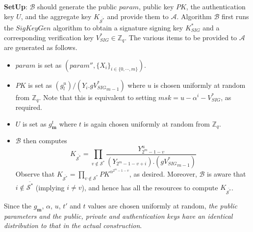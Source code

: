 \noindent \textbf{SetUp}: $\mathcal{B}$ should generate the public $param$, public key $PK$, the authentication key $U$, and the aggregate key $K_{\overline{{\mathcal{S}}^{*}}}$ and provide them to $\mathcal{A}$. Algorithm $\mathcal{B}$ first runs the $SigKeyGen$ algorithm to obtain a signature signing key $K^{*}_{SIG}$ and a corresponding verification key $V^{*}_{SIG} \in \mathbb{Z}_q$. The various items to be provided to $\mathcal{A}$ are generated as follows.
\begin{itemize}
  \item $param$ is set as $(param'',\{X_i\}_{i\in\{0,\cdots,m\}})\nonumber$.
  \item $PK$ is set as $\left({g^u_{l}}\right)/{\left(Y_i.g{V^{*}_{SIG}}_{m-1}\right)}$ where $u$ is chosen uniformly at random from $\mathbb{Z}_q$. Note that this is equivalent to setting $msk=u-\alpha^i-V^{*}_{SIG}$, as required.
  \item $U$ is set as $g^{t}_{\mathbf{m}}$ where $t$ is again chosen uniformly at random from $\mathbb{Z}_q$.
  \item $\mathcal{B}$ then computes   
  \begin{equation}
   K_{\overline{{\mathcal{S}}^{*}}} = \prod_{v\notin{\mathcal{S}}^{*}}\frac{Y^{u}_{2^m-1-v}}{(Y_{2^m-1-v+i}).(g{V^{*}_{SIG}}_{m-1})}\nonumber
  \end{equation}
  \noindent Observe that $K_{\overline{{\mathcal{S}}^{*}}}=\prod_{v\notin{\mathcal{S}}^{*}}PK^{\alpha^{2^m-1-v}}$, as desired. Moreover, $\mathcal{B}$ is aware that $i\notin \overline{{\mathcal{S}}^{*}}$ (implying $i\neq v$), and hence has all the resources to compute $K_{\overline{{\mathcal{S}}^{*}}}$.  
\end{itemize}
 
\noindent Since the $g_{\mathbf{m}}$, $\alpha$, $u$, $t'$ and $t$ values are chosen uniformly at random, \emph{the public parameters and the public, private and authentication keys have an identical distribution to that in the actual construction}.\\

